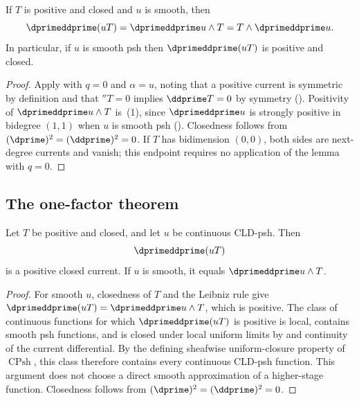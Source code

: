 \begin{corollary}
\label{cor:ch16-smooth-case}
If $T$ is positive and closed and $u$ is smooth, then
\[
 \dprimeddprime(uT)=\dprimeddprime u\wedge T=T\wedge\dprimeddprime u .
\]
In particular, if $u$ is smooth psh then $\dprimeddprime(uT)$ is positive
and closed.
\end{corollary}

\begin{proof}
Apply  with $q=0$ and $\alpha=u$, noting that
a positive current is symmetric by definition and that $\dprime T=0$ implies
$\ddprime T=0$ by symmetry ().
Positivity of $\dprimeddprime u\wedge T$ is
\,(1), since $\dprimeddprime u$ is
strongly positive in bidegree $(1,1)$ when $u$ is smooth psh
().  Closedness follows from
$(\dprime)^2=(\ddprime)^2=0$.  If $T$ has bidimension $(0,0)$,
both sides are next-degree currents and vanish; this endpoint requires no
application of the lemma with $q=0$.
\end{proof}

\subsection{The one-factor theorem}
\label{sec:ch16-one-factor-theorem}

\begin{theorem}
\label{thm:one-bt-factor}
Let $T$ be positive and closed, and let $u$ be continuous CLD-psh.  Then
\[
                         \dprimeddprime(uT)
\]
is a positive closed current.  If $u$ is smooth, it equals
$\dprimeddprime u\wedge T$.
\end{theorem}
\begin{proof}
For smooth $u$, closedness of $T$ and the Leibniz rule give
$\dprimeddprime(uT)=\dprimeddprime u\wedge T$, which is positive.  The class
of continuous functions for which $\dprimeddprime(uT)$ is positive is local,
contains smooth psh functions, and is closed under local uniform limits by
 and continuity of the
current differential.  By the defining sheafwise uniform-closure property
of $\operatorname{CPsh}$, this class therefore contains every continuous
CLD-psh function.  This argument does not choose a direct smooth
approximation of a higher-stage function.  Closedness follows from
$(\dprime)^2=(\ddprime)^2=0$.
\end{proof}

